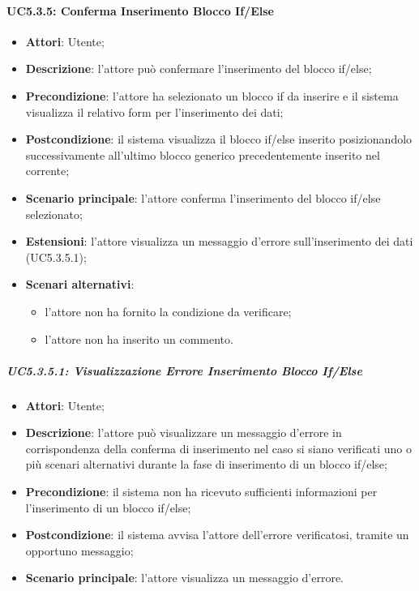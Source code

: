 \paragraph{UC5.3.5: Conferma Inserimento Blocco If/Else}
\label{UC5.3.5}
\begin{itemize}
	\item \textbf{Attori}: Utente;
	\item \textbf{Descrizione}: l'attore può confermare l'inserimento del blocco if/else;
	\item \textbf{Precondizione}: l'attore ha selezionato un blocco if da inserire e il sistema visualizza il relativo form per l'inserimento dei dati;
	\item \textbf{Postcondizione}: il sistema visualizza il blocco if/else inserito posizionandolo successivamente all'ultimo blocco generico precedentemente inserito nel  corrente;
	\item \textbf{Scenario principale}: l'attore conferma l'inserimento del blocco if/else selezionato;
	\item \textbf{Estensioni}: l'attore visualizza un messaggio d'errore sull'inserimento dei dati (UC5.3.5.1);
	\item \textbf{Scenari alternativi}:
	\begin{itemize}
		\item l'attore non ha fornito la condizione da verificare;
		\item l'attore non ha inserito un commento.
	\end{itemize}
\end{itemize}

\subparagraph{UC5.3.5.1: Visualizzazione Errore Inserimento Blocco If/Else}
\label{UC5.3.5.1}
\begin{itemize}
	\item \textbf{Attori}: Utente;
	\item \textbf{Descrizione}: l'attore può visualizzare un messaggio d'errore in corrispondenza della conferma di inserimento nel caso si siano verificati uno o più scenari alternativi durante la fase di inserimento di un blocco if/else;
	\item \textbf{Precondizione}: il sistema non ha ricevuto sufficienti informazioni per l'inserimento di un blocco if/else;
	\item \textbf{Postcondizione}: il sistema avvisa l'attore dell'errore verificatosi, tramite un opportuno messaggio;
	\item \textbf{Scenario principale}: l'attore visualizza un messaggio d'errore.
\end{itemize}

